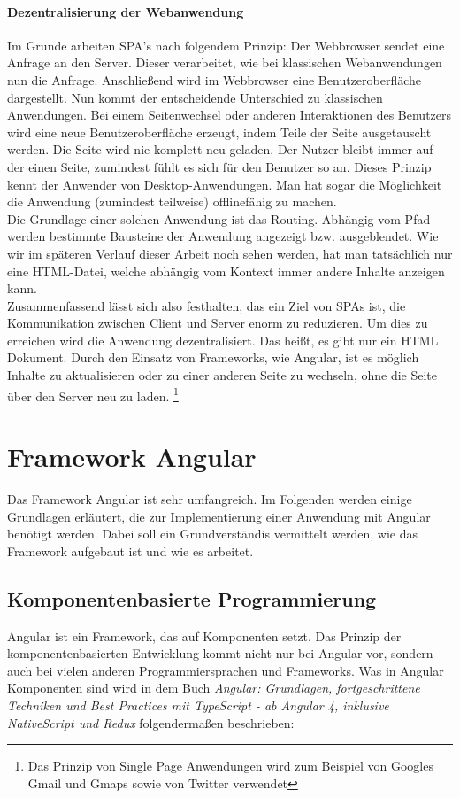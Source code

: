 \paragraph{Dezentralisierung der Webanwendung}
%
Im Grunde arbeiten SPA's nach folgendem Prinzip: Der Webbrowser sendet eine Anfrage an den Server. Dieser verarbeitet, wie bei klassischen Webanwendungen nun die Anfrage. Anschließend wird im Webbrowser eine Benutzeroberfläche dargestellt. Nun kommt der entscheidende Unterschied zu klassischen Anwendungen. Bei einem Seitenwechsel oder anderen Interaktionen des Benutzers wird eine neue Benutzeroberfläche erzeugt, indem Teile der Seite ausgetauscht werden. Die Seite wird nie komplett neu geladen. Der Nutzer bleibt immer auf der einen Seite, zumindest fühlt es sich für den Benutzer so an. Dieses Prinzip kennt der Anwender von Desktop-Anwendungen. Man hat sogar die Möglichkeit die Anwendung (zumindest teilweise) offlinefähig zu machen.\\
Die Grundlage einer solchen Anwendung ist das Routing. Abhängig vom Pfad werden bestimmte Bausteine der Anwendung angezeigt bzw. ausgeblendet. Wie wir im späteren Verlauf dieser Arbeit noch sehen werden, hat man tatsächlich nur eine HTML-Datei, welche abhängig vom Kontext immer andere Inhalte anzeigen kann.\\
%
Zusammenfassend lässt sich also festhalten, das ein Ziel von SPAs ist, die Kommunikation zwischen Client und Server enorm zu reduzieren. Um dies zu erreichen wird die Anwendung dezentralisiert. Das heißt, es gibt nur ein HTML Dokument\cite{domin_was_2018}. Durch den Einsatz von Frameworks, wie Angular, ist es möglich Inhalte zu aktualisieren oder zu einer anderen Seite zu wechseln, ohne die Seite über den Server neu zu laden.
\footnote{Das Prinzip von Single Page Anwendungen wird zum Beispiel von Googles Gmail und Gmaps sowie von Twitter verwendet}
%
%
%
%
%
\section{Framework Angular}
\label{sec:angular7}
Das Framework Angular ist sehr umfangreich. Im Folgenden werden einige Grundlagen erläutert, die zur Implementierung einer Anwendung mit Angular benötigt werden. Dabei soll ein Grundverständis vermittelt werden, wie das Framework aufgebaut ist und wie es arbeitet.
\subsection{Komponentenbasierte Programmierung}
%
Angular ist ein Framework, das auf Komponenten setzt. Das Prinzip der komponentenbasierten Entwicklung kommt nicht nur bei Angular vor, sondern auch bei vielen anderen Programmiersprachen und Frameworks. Was in Angular Komponenten sind wird in dem Buch \textit{Angular: Grundlagen, fortgeschrittene Techniken und Best Practices mit TypeScript - ab Angular 4, inklusive NativeScript und Redux} folgendermaßen beschrieben:\\
%


